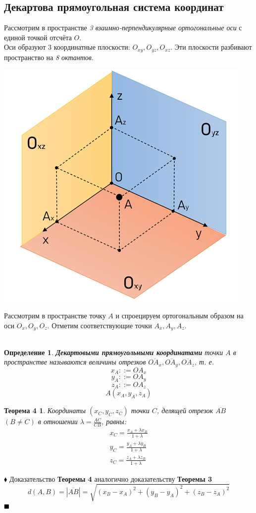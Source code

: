 \documentclass[a4paper, 12pt]{report}
\begin{document}
	\subsection{Декартова прямоугольная система координат}
	\quad{} Рассмотрим в пространстве \textit{3 взаимно-перпендикулярные ортогональные оси} с единой точкой отсчёта $O$. \\
	Оси образуют 3 координатные плоскости: $O_{xy}, O_{yz}, O_{xz}$. Эти плоскости разбивают пространство на \textit{8 октантов}.
	\begin{center}
		\includegraphics{img/1.3.1 3d dpsk.png}
	\end{center}
	\quad{} Рассмотрим в пространстве точку $A$ и спроецируем ортогональным образом на оси $O_x, O_y, O_z$. Отметим соответствующие точки $A_x, A_y, A_z$.\\\\
	\newtheorem*{Def3}{Определение}
	\begin{Def3}
		\textbf{Декартовыми прямоугольными координатами} точки $A$ в пространстве называются величины отрезков $\overline{OA_x}, \overline{OA_y}, \overline{OA_z}$, т. е.
			$$x_A ::= OA_x$$
			$$y_A ::= OA_y$$
			$$z_A ::= OA_z$$
			$$A (x_A, y_A, z_A)$$
	\end{Def3}
	\newtheorem*{Th4}{Теорема 4}
	\begin{Th4}\label{th4}
		Координаты $(x_C, y_C, z_C)$ точки $C$, делящей отрезок $\overline{AB}$ $(B \ne C)$ в отношении $\lambda = \frac{AC}{CB}$, равны:
		\begin{equation}\label{1.13}
			\left.
			\begin{aligned}
					x_C = \frac{x_A + \lambda x_B}{1 + \lambda} \\
					y_C = \frac{y_A + \lambda y_B}{1 + \lambda} \\
					z_C = \frac{z_A + \lambda z_B}{1 + \lambda}
			\end{aligned}
			\right. \tag{13}
		\end{equation}
	\end{Th4}
	$\blacklozenge$ \quad{}
	Доказательство \textbf{Теоремы 4} аналогично доказательству \textbf{Теоремы 3}
	\begin{equation}\label{1.14}
	d(A, B) = |\overline{AB}| = \sqrt{(x_B - x_A)^2 + (y_B - y_A)^2 + (z_B - z_A)^2} \tag{14}
	\end{equation}
	$\hfill\blacksquare$
	
\end{document}
